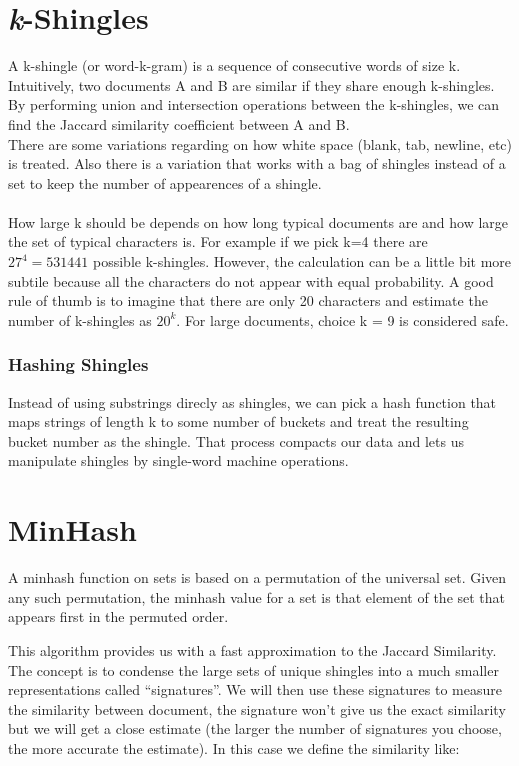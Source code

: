 \documentclass[12pt]{article}
\begin{document}
\section{\textit{k}-Shingles}

A k-shingle (or word-k-gram) is a sequence of consecutive words of size k. Intuitively, two documents A and B are similar if they share enough k-shingles. By performing union and intersection operations between the k-shingles, we can find the Jaccard similarity coefficient between A and B. 
\\
There are some variations regarding on how white space (blank, tab, newline, etc) is treated. Also there is a variation that works with a bag of shingles instead of a set to keep the number of appearences of a shingle. \medskip \\
\\
How large k should be depends on how long typical documents are and how large the set of typical characters is. For example if we pick k=4 there are $27^4=531441 $ possible k-shingles. However, the calculation can be a little bit more subtile because all the characters do not appear with equal probability. A good rule of thumb is to imagine that there are only 20 characters and estimate the number of k-shingles as $20^k$. For large documents, choice k = 9 is considered safe. 

\subsubsection{Hashing Shingles}

Instead of using substrings direcly as shingles, we can pick a hash function that maps strings of length k to some number of buckets and treat the resulting bucket number as the shingle. That process compacts our data and lets us manipulate shingles by single-word machine operations.

\section{MinHash}

A minhash function on sets is based on a permutation of the universal set. Given any such permutation, the minhash value for a set is that element of the set that appears first in the permuted order. 

This algorithm provides us with a fast approximation to the Jaccard Similarity. The concept is to condense the large sets of unique shingles into a much smaller representations called ``signatures''. We will then use these signatures to measure the similarity between document, the signature won't give us the exact similarity but we will get a close estimate (the larger the number of signatures you choose, the more accurate the estimate). In this case we define the similarity like: 
\\ \medskip
\end{document}
